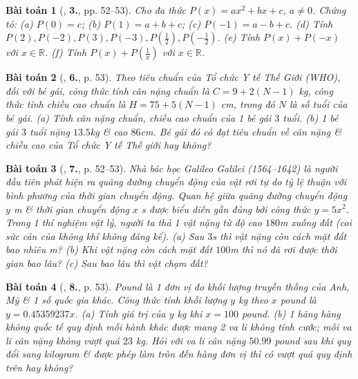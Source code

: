 \documentclass{article}
\numberwithin{equation}{section}
\newtheorem{baitoan}{Bài toán}
\begin{document}
\begin{baitoan}[\cite{SGK_Toan_7_Canh_Dieu_tap_2}, \textbf{3.}, pp. 52--53]
	Cho đa thức $P(x) = ax^2 + bx + c$, $a\ne0$. Chứng tỏ: (a) $P(0) = c$; (b) $P(1) = a + b + c$; (c) $P(-1) = a - b + c$. (d) Tính $P(2),P(-2),P(3),P(-3),P\left(\frac{1}{2}\right),P\left(-\frac{1}{2}\right)$. (e) Tính $P(x) + P(-x)$ với $x\in\mathbb{R}$. (f) Tính $P(x) + P\left(\frac{1}{x}\right)$ với $x\in\mathbb{R}$.
\end{baitoan}

\begin{baitoan}[\cite{SGK_Toan_7_Canh_Dieu_tap_2}, \textbf{6.}, p. 53]
	Theo tiêu chuẩn của Tổ chức Y tế Thế Giới (WHO), đối với bé gái, công thức tính cân nặng chuẩn là $C = 9 + 2(N - 1)$ \emph{kg}, công thức tính chiều cao chuẩn là $H = 75 + 5(N - 1)$ \emph{cm}, trong đó $N$ là số tuổi của bé gái. (a) Tính cân nặng chuẩn, chiều cao chuẩn của 1 bé gái $3$ tuổi. (b) 1 bé gái $3$ tuổi nặng $13.5$\emph{kg} \& cao $86$\emph{cm}. Bé gái đó có đạt tiêu chuẩn về cân nặng \& chiều cao của Tổ chức Y tế Thế giới hay không?
\end{baitoan}

\begin{baitoan}[\cite{SGK_Toan_7_Canh_Dieu_tap_2}, \textbf{7.}, p. 52--53]
	Nhà bác học Galileo Galilei (1564--1642) là người đầu tiên phát hiện ra quãng đường chuyển động của vật rơi tự do tỷ lệ thuận với bình phương của thời gian chuyển động. Quan hệ giữa quãng đường chuyển động $y$ \emph{m} \& thời gian chuyển động $x$ \emph{s} được biểu diễn gần đúng bởi công thức $y = 5x^2$. Trong 1 thí nghiệm vật lý, người ta thả 1 vật nặng từ độ cao $180$\emph{m} xuống đất (coi sức cản của không khí không đáng kể). (a) Sau $3$\emph{s} thì vật nặng còn cách mặt đất bao nhiêu \emph{m}? (b) Khi vật nặng còn cách mặt đất $100$\emph{m} thì nó đã rơi được thời gian bao lâu? (c) Sau bao lâu thì vật chạm đất?
\end{baitoan}

\begin{baitoan}[\cite{SGK_Toan_7_Canh_Dieu_tap_2}, \textbf{8.}, p. 53]
	Pound là 1 đơn vị đo khối lượng truyền thống của Anh, Mỹ \& 1 số quốc gia khác. Công thức tính khối lượng $y$ \emph{kg} theo $x$ pound là $y = 0.45359237x$. (a) Tính giá trị của $y$ \emph{kg} khi $x = 100$ pound. (b) 1 hãng hàng không quốc tế quy định mỗi hành khác được mang 2 va li không tính cước; mỗi va li cân nặng không vượt quá $23$ \emph{kg}. Hỏi với va li cân nặng $50.99$ pound sau khi quy đổi sang kilogram \& được phép làm tròn đến hàng đơn vị thì có vượt quá quy định trên hay không?
\end{baitoan}
\end{document}

